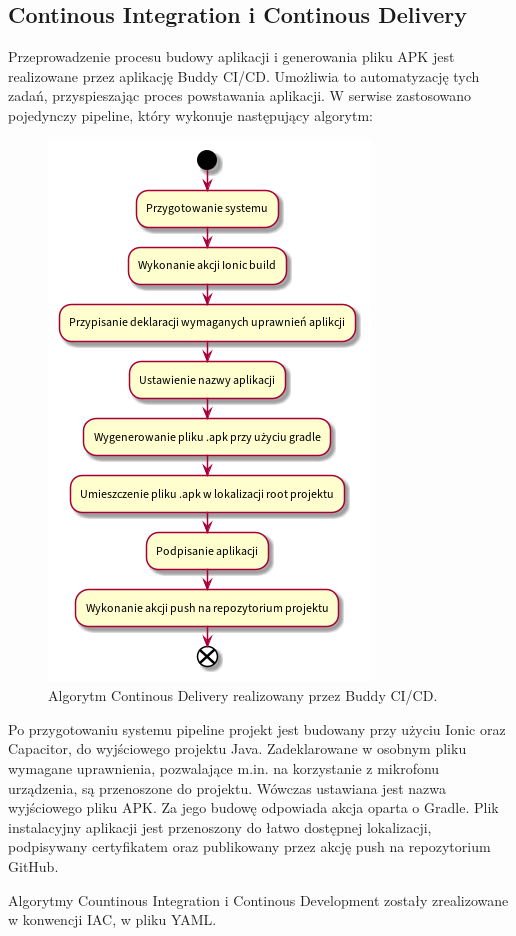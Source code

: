\subsection{Continous Integration i Continous Delivery}
Przeprowadzenie procesu budowy aplikacji i generowania pliku APK jest realizowane przez aplikację
Buddy CI/CD. Umożliwia to automatyzację tych zadań, przyspieszając proces powstawania aplikacji.
W serwise zastosowano pojedynczy pipeline, który wykonuje następujący algorytm:

\begin{figure}[H]
	\begin{center}
		\includegraphics[scale=0.6]{media/ContinousDelivery.png}
	\end{center}
	\caption{Algorytm Continous Delivery realizowany przez Buddy CI/CD.}
	\label{rys:continous-delivery}
\end{figure}

Po przygotowaniu systemu pipeline projekt jest budowany przy użyciu Ionic oraz Capacitor, do wyjściowego projektu Java.
Zadeklarowane w osobnym pliku wymagane uprawnienia, pozwalające m.in. na korzystanie z mikrofonu urządzenia, są
przenoszone do projektu. Wówczas ustawiana jest nazwa wyjściowego pliku APK.
Za jego budowę odpowiada akcja oparta o Gradle. Plik instalacyjny aplikacji jest przenoszony do łatwo dostępnej
lokalizacji, podpisywany certyfikatem oraz publikowany przez akcję push na repozytorium GitHub.

Algorytmy Countinous Integration i Continous Development zostały zrealizowane w konwencji IAC, w pliku YAML.